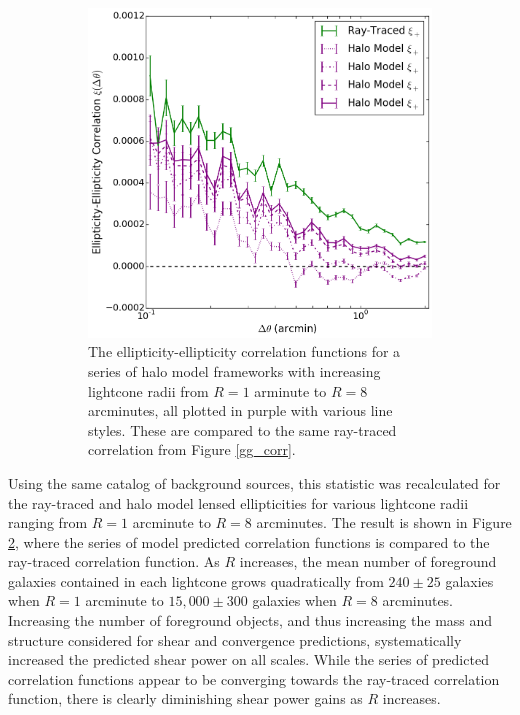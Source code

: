 \documentclass[%
 reprint,
 amsmath,amssymb,
 aps,nofootinbib
]{revtex4-1}
\begin{document}
\begin{figure}
\begin{subfigure}[h]{0.475\textwidth}
        \includegraphics[width=\textwidth]{figs-swe/gg_corr_series.png}
        \captionsetup{justification=raggedright,singlelinecheck=false}
        \caption{The ellipticity-ellipticity correlation functions for a series of halo model frameworks with increasing lightcone radii from $R=1$ arminute to $R=8$ arcminutes, all plotted in purple with various line styles. These are compared to the same ray-traced correlation from Figure \ref{gg_corr}.}
        \label{gg_corr_series}
    \end{subfigure}
    \caption{}
\end{figure}

Using the same catalog of background sources, this statistic was recalculated for the ray-traced and halo model lensed ellipticities for various lightcone radii ranging from $R=1$ arcminute to $R=8$ arcminutes. The result is shown in Figure \ref{gg_corr_series}, where the series of model predicted correlation functions is compared to the ray-traced correlation function. As $R$ increases, the mean number of foreground galaxies contained in each lightcone grows quadratically from ${240\pm25}$ galaxies when $R=1$ arcminute to ${15,000\pm300}$ galaxies when $R=8$ arcminutes. Increasing the number of foreground objects, and thus increasing the mass and structure considered for shear and convergence predictions, systematically increased the predicted shear power on all scales. While the series of predicted correlation functions appear to be converging towards the ray-traced correlation function, there is clearly diminishing shear power gains as $R$ increases.
\end{document}
